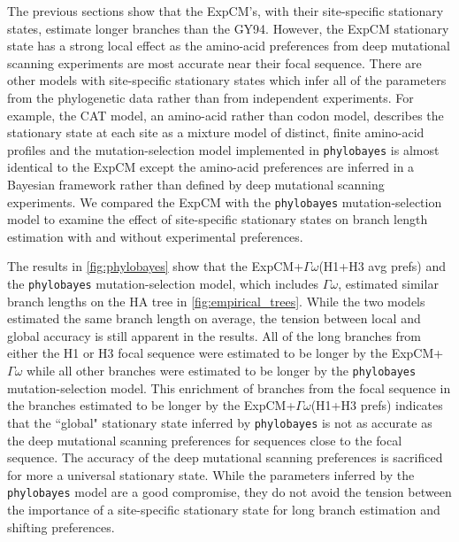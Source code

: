 \documentclass[11pt]{article}
\begin{document}
The previous sections show that the ExpCM's, with their site-specific stationary states, estimate longer branches than the GY94. 
However, the ExpCM stationary state has a strong local effect as the amino-acid preferences from deep mutational scanning experiments are most accurate near their focal sequence. 
There are other models with site-specific stationary states which infer all of the parameters from the phylogenetic data rather than from independent experiments. 
For example, the CAT model, an amino-acid rather than codon model, describes the stationary state at each site as a mixture model of distinct, finite amino-acid profiles and the mutation-selection model implemented in \texttt{phylobayes} is almost identical to the ExpCM except the amino-acid preferences are inferred in a Bayesian framework rather than defined by deep mutational scanning experiments. 
We compared the ExpCM with the \texttt{phylobayes} mutation-selection model to examine the effect of site-specific stationary states on branch length estimation with and without experimental preferences. 

The results in \ref{fig:phylobayes} show that the ExpCM+$\Gamma\omega$(H1+H3 avg prefs) and the \texttt{phylobayes} mutation-selection model, which includes $\Gamma\omega$, estimated similar branch lengths on the HA tree in \ref{fig:empirical_trees}. 
While the two models estimated the same branch length on average, the tension between local and global accuracy is still apparent in the results. 
All of the long branches from either the H1 or H3 focal sequence were estimated to be longer by the ExpCM+$\Gamma\omega$ while all other branches were estimated to be longer by the \texttt{phylobayes} mutation-selection model. 
This enrichment of branches from the focal sequence in the branches estimated to be longer by the ExpCM+$\Gamma\omega$(H1+H3 prefs) indicates that the ``global" stationary state inferred by \texttt{phylobayes} is not as accurate as the deep mutational scanning preferences for sequences close to the focal sequence. 
The accuracy of the deep mutational scanning preferences is sacrificed for more a universal stationary state. 
While the parameters inferred by the \texttt{phylobayes} model are a good compromise, they do not avoid the tension between the importance of a site-specific stationary state for long branch estimation and shifting preferences. 
\end{document}
